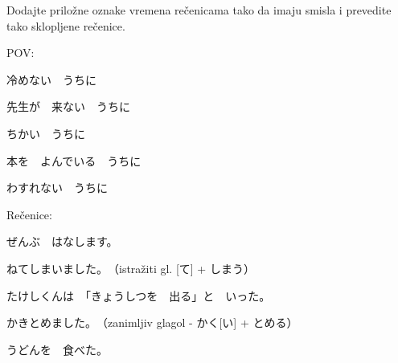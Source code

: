 
\author{Tomislav Mamić}

	
	Dodajte priložne oznake vremena rečenicama tako da imaju smisla i prevedite tako sklopljene rečenice.
	
	\begin{mondai}{POV:}
		\item 冷めない　うちに
		\item 先生が　来ない　うちに
		\item ちかい　うちに
		\item 本を　よんでいる　うちに
		\item わすれない　うちに
	\end{mondai}

	\begin{mondai}{Rečenice:}
		\item ぜんぶ　はなします。
		\item ねてしまいました。　（istražiti gl. [て] + しまう）
		\item たけしくんは　「きょうしつを　出る」と　いった。
		\item かきとめました。　（zanimljiv glagol - かく[い] + とめる）
		\item うどんを　食べた。
	\end{mondai}
